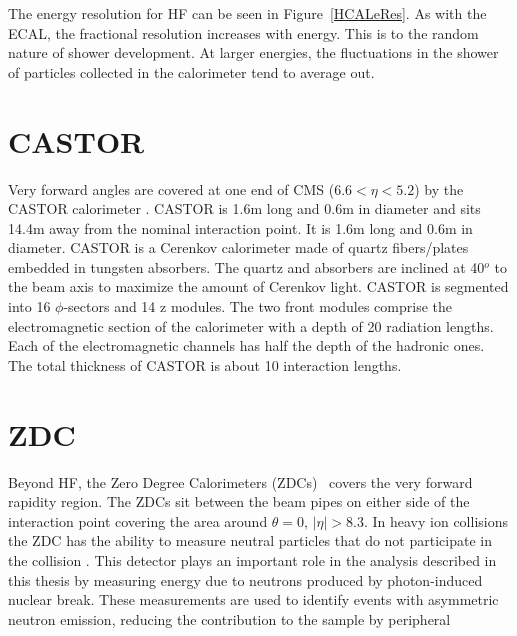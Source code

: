     The energy resolution for HF can be seen in Figure~\ref{HCALeRes}.  
    As with the ECAL, the fractional resolution increases with energy. 
    This is \DIFdelbegin {}\DIFdelend \DIFaddbegin {}\DIFaddend to the random nature of shower development. 
    At larger energies, the fluctuations in the shower of particles collected 
      in the calorimeter tend to average out.

  \section{CASTOR}
   Very forward angles are covered at one end of CMS ($6.6 < \eta < 5.2$) by 
     the CASTOR calorimeter \cite{Andreev:2010zzb}.
   CASTOR is 1.6m long and 0.6m in diameter and sits 14.4m away from the nominal
     interaction point. It is 1.6m long and 0.6m in diameter. 
   CASTOR is a Cerenkov calorimeter made of quartz fibers/plates embedded in 
     tungsten absorbers.
   The quartz and absorbers are inclined at 40$^o$ to the beam axis to maximize
     the amount of Cerenkov light. 
   CASTOR is segmented into 16 $\phi$-sectors and 14 z modules.
   The two front modules comprise the electromagnetic section of the calorimeter
     with a depth of 20 radiation lengths. 
   Each of the electromagnetic channels has half the depth of the hadronic ones. 
   The total thickness  of CASTOR is about 10 interaction lengths. 

  \section{ZDC \label{sec:zdcDet}} 
    Beyond HF, the Zero Degree Calorimeters (ZDCs)~\cite{Grachov:2006ke} covers the very forward 
      rapidity region.
    The ZDCs sit between the beam pipes on either side of the interaction point 
      covering the area around $\theta = 0$, $|\eta| > 8.3$.
    In heavy ion collisions the ZDC has the ability to measure neutral particles 
    	that do not participate in the collision \cite{tCmsE}.
    This detector plays an important role in the analysis described in this
      thesis by measuring energy due to neutrons produced by photon-induced 
      nuclear break.
    These measurements are used to identify events with asymmetric neutron 
      emission, reducing the contribution to the sample by peripheral \DIFdelbegin {}\DIFdelend \DIFaddbegin {}\DIFaddend 

